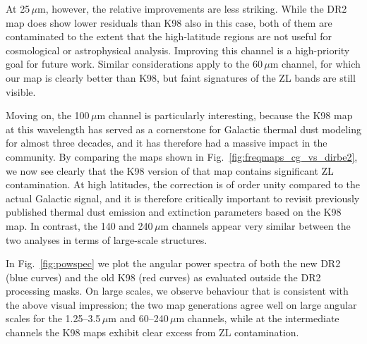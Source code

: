 \documentclass{aa}
\begin{document}
At 25$\,\mu$m, however, the relative improvements are less
striking. While the DR2 map does show lower residuals than K98 also in
this case, both of them  are contaminated to the extent that
the high-latitude regions are not useful for cosmological or
astrophysical analysis. Improving this channel is a
high-priority goal for future work. Similar considerations apply to
the 60\,$\mu$m channel, for which our map is clearly better than K98,
but faint signatures of the ZL bands are still visible.

Moving on, the 100\,$\mu$m channel is particularly interesting,
because the K98 map at this wavelength has served as a cornerstone for
Galactic thermal dust modeling for almost three decades, and it has
therefore had a massive impact in the community. By comparing the maps
shown in Fig.~\ref{fig:freqmaps_cg_vs_dirbe2}, we now see clearly that
the K98 version of that map contains significant ZL contamination. At
high latitudes, the correction is of order unity compared to the
actual Galactic signal, and it is therefore critically important to
revisit previously published thermal dust emission and extinction
parameters based on the K98 map. In contrast, the 140 and 240$\,\mu$m
channels appear very similar between the two analyses in terms of
large-scale structures.

In Fig.~\ref{fig:powspec} we plot the angular power spectra of both
the new DR2 (blue curves) and the old K98 (red curves) as evaluated
outside the DR2 processing masks. On large scales, we observe
behaviour that is consistent with the above visual impression; the two
map generations agree well on large angular scales for the
1.25--3.5$\,\mu$m and 60--240$\,\mu$m channels, while at the
intermediate channels the K98 maps exhibit clear excess from ZL
contamination.
\end{document}
